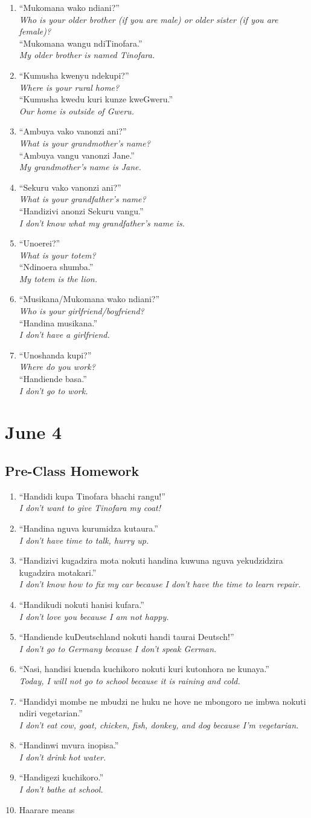 \documentclass[12pt]{article}
\newcommand{\tl}[2]{``#1''\\\textit{#2}}
\newcommand{\resp}[4]{%
  \tl{#1}{#2} \\
  \tl{#3}{#4}
}
\begin{document}
\begin{enumerate}
\item \resp{Mukomana wako ndiani?}{Who is your older brother (if you are male) or older sister (if you are female)?}{Mukomana wangu ndiTinofara.}{My older brother is named Tinofara.}
\item \resp{Kumusha kwenyu ndekupi?}{Where is your rural home?}{Kumusha kwedu kuri kunze kweGweru.}{Our home is outside of Gweru.}
\item \resp{Ambuya vako vanonzi ani?}{What is your grandmother's name?}{Ambuya vangu vanonzi Jane.}{My grandmother's name is Jane.}
\item \resp{Sekuru vako vanonzi ani?}{What is your grandfather's name?}{Handizivi anonzi Sekuru vangu.}{I don't know what my grandfather's name is.}
\item \resp{Unoerei?}{What is your totem?}{Ndinoera shumba.}{My totem is the lion.}
\item \resp{Musikana/Mukomana wako ndiani?}{Who is your girlfriend/boyfriend?}{Handina musikana.}{I don't have a girlfriend.}
\item \resp{Unoshanda kupi?}{Where do you work?}{Handiende basa.}{I don't go to work.}
\end{enumerate}

\section{June 4}
\subsection{Pre-Class Homework}
\begin{enumerate}
\item \tl{Handidi kupa Tinofara bhachi rangu!}{I don't want to give Tinofara my coat!}
\item \tl{Handina nguva kurumidza kutaura.}{I don't have time to talk, hurry up.}
\item \tl{Handizivi kugadzira mota nokuti handina kuwuna nguva yekudzidzira kugadzira motakari.}{I don't know how to fix my car because I don't have the time to learn repair.}
\item \tl{Handikudi nokuti hanisi kufara.}{I don't love you because I am not happy.}
\item \tl{Handiende kuDeutschland nokuti handi taurai Deutsch!}{I don't go to Germany because I don't speak German.}
\item \tl{Nasi, handisi kuenda kuchikoro nokuti kuri kutonhora ne kunaya.}{Today, I will not go to school because it is raining and cold.}
\item \tl{Handidyi mombe ne mbudzi ne huku ne hove ne mbongoro ne imbwa nokuti ndiri vegetarian.}{I don't eat cow, goat, chicken, fish, donkey, and dog because I'm vegetarian.}
\item \tl{Handinwi mvura inopisa.}{I don't drink hot water.}
\item \tl{Handigezi kuchikoro.}{I don't bathe at school.}
\item Haarare means
\end{enumerate}
\end{document}

